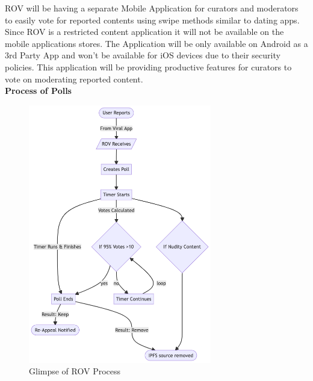 \documentclass[10pt]{article}
\begin{document}
ROV will be having a separate Mobile Application for curators and moderators to easily vote for reported contents using swipe methods similar to dating apps. Since ROV is a restricted content application it will not be available on the mobile applications stores. The Application will be only available on Android as a 3rd Party App and won’t be available for iOS devices due to their security policies. This application will be providing productive features for curators to vote on moderating reported content. \\

\textbf{Process of Polls}\\



\begin{figure}[H]
\begin{center}
\includegraphics[width=8cm]{rov-poll}
\caption{Glimpse of ROV Process}
\end{center}
\end{figure}

\end{document}
